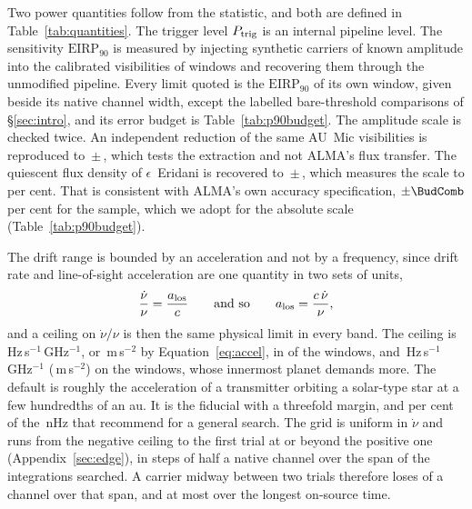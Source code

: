 Two power quantities follow from the statistic, and both are defined in
Table~\ref{tab:quantities}. The trigger level $P_{\rm trig}$ is an internal
pipeline level. The sensitivity $\mathrm{EIRP}_{90}$ is measured by injecting
synthetic carriers of known amplitude into the calibrated visibilities of
\SensNInj{} windows and recovering them through the unmodified pipeline.
Every limit quoted is the $\mathrm{EIRP}_{90}$ of its own window, given beside
its native channel width, except the labelled bare-threshold comparisons of
\S\ref{sec:intro}, and its error budget is Table~\ref{tab:p90budget}. The
amplitude scale is checked twice. An independent reduction of the same
AU~Mic visibilities is reproduced to \PxJanRatio\,$\pm$\,\PxJanRatioErr,
which tests the extraction and not ALMA's flux transfer. The quiescent flux
density of $\epsilon$~Eridani \citep{Burton2022} is recovered to
\PxEpsRatio\,$\pm$\,\PxEpsRatioErr, which measures the scale to \SbEpsPct{}
per cent. That is consistent with ALMA's own accuracy specification,
$\pm\BudComb$ per cent for the sample, which we adopt for the absolute scale
(Table~\ref{tab:p90budget}).

The drift range is bounded by an acceleration and not by a frequency, since
drift rate and line-of-sight acceleration are one quantity in two sets of
units,
%
\begin{equation}
\frac{\dot\nu}{\nu}=\frac{a_{\rm los}}{c}
\qquad\text{and so}\qquad
a_{\rm los}=\frac{c\,\dot\nu}{\nu},
\label{eq:accel}
\end{equation}
%
and a ceiling on $\dot\nu/\nu$ is then the same physical limit in every band.
The ceiling is \DriftCeilLo\,Hz\,s$^{-1}$\,GHz$^{-1}$, or
\AccelCeilMed\,m\,s$^{-2}$ by Equation~\ref{eq:accel}, in \AccelNDefault{} of
the \NWinA{} windows, and \DriftCeilHi\,Hz\,s$^{-1}$\,GHz$^{-1}$
(\AccelCeilMax\,m\,s$^{-2}$) on the \AccelNWide{} \AccelWideStar{} windows,
whose innermost planet demands more. The default is roughly the acceleration
of a transmitter orbiting a solar-type star at a few hundredths of an au. It
is the \citet{Mason2025} fiducial with a threefold margin, and
\AccelSheikhPct{} per cent of the \AccelSheikhNHz\,nHz that
\citet{Sheikh2019} recommend for a general search. The grid is uniform in
$\dot\nu$ and runs from the negative ceiling to the first trial at or beyond
the positive one (Appendix~\ref{sec:edge}), in steps of half a native channel
over the span of the integrations searched. A carrier midway between two
trials therefore loses \DriftGridSpanHalf{} of a channel over that span, and
at most \DriftGridFineHalf{} over the longest on-source time.

